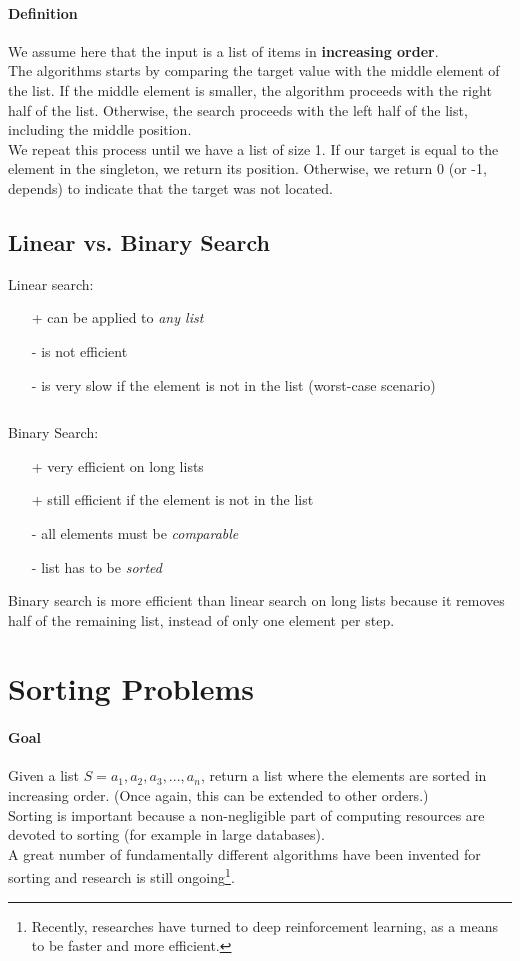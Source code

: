 \documentclass[10pt,a4paper]{book}
\begin{document}
\paragraph*{Definition}
We assume here that the input is a list of items in \textbf{increasing order}.\\
The algorithms starts by comparing the target value with the middle element of the list. If the middle element is smaller, the algorithm proceeds with the right half of the list. Otherwise, the search proceeds with the left half of the list, including the middle position.\\
We repeat this process until we have a list of size 1. If our target is equal to the element in the singleton, we return its position. Otherwise, we return 0 (or -1, depends) to indicate that the target was not located.

\subsection{Linear vs. Binary Search}
\begin{multicols}{2}
Linear search:
\begin{itemize}
\item[+]can be applied to \textit{any list}
\item[-]is not efficient
\item[-]is very slow if the element is not in the list (worst-case scenario)\par
$\ $\par
\end{itemize}
\columnbreak
Binary Search:
\begin{itemize}
\item[+]very efficient on long lists
\item[+]still efficient if the element is not in the list
\item[-]all elements must be \textit{comparable}
\item[-]list has to be \textit{sorted}
\end{itemize}
\end{multicols}
Binary search is more efficient than linear search on long lists because it removes half of the remaining list, instead of only one element per step.

\section{Sorting Problems}
\paragraph*{Goal}
Given a list $S = a_{1},a_{2},a_{3},...,a_{n}$, return a list where the elements are sorted in increasing order. (Once again, this can be extended to other orders.)\\
Sorting is important because a non-negligible part of computing resources are devoted to sorting (for example in large databases). \\
A great number of fundamentally different algorithms have been invented for sorting and research is still ongoing\footnote{Recently, researches have turned to deep reinforcement learning, as a means to be faster and more efficient.}.
\end{document}
